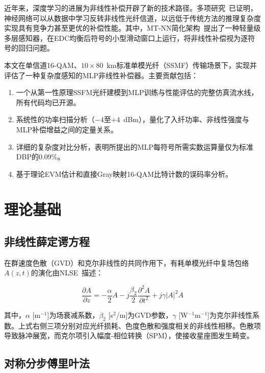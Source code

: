 \documentclass[conference]{IEEEtran}
\begin{document}
近年来，深度学习的进展为非线性补偿开辟了新的技术路径。多项研究~\cite{gdpkan2025,operator2025,mtnn2025}已证明，神经网络可以从数据中学习反转非线性光纤信道，以远低于传统方法的推理复杂度实现具有竞争力甚至更优的补偿性能。其中，MT-NN简化架构~\cite{mtnn2025}提出了一种轻量级多层感知器，在EDC均衡后符号的小型滑动窗口上运行，将非线性补偿视为逐符号的回归问题。

本文在单信道16-QAM、$10 \times 80$~km标准单模光纤（SSMF）传输场景下，实现并评估了一种复杂度感知的MLP非线性补偿器。主要贡献包括：

\begin{enumerate}
    \item 一个从第一性原理SSFM光纤建模到MLP训练与性能评估的完整仿真流水线，所有代码均已开源。
    \item 系统性的功率扫描分析（$-4$至$+4$~dBm），量化了入纤功率、非线性强度与MLP补偿增益之间的定量关系。
    \item 详细的复杂度对比分析，表明所提出的MLP每符号所需实数运算量仅为标准DBP的0.09\%。
    \item 基于理论EVM估计和直接Gray映射16-QAM比特计数的误码率分析。
\end{enumerate}

\section{理论基础}
\label{sec:theory}

\subsection{非线性薛定谔方程}

在群速度色散（GVD）和克尔非线性的共同作用下，有耗单模光纤中复场包络$A(z, t)$的演化由NLSE~\cite{agrawal2001}描述：

\begin{equation}
\frac{\partial A}{\partial z} = -\frac{\alpha}{2}A
- j\frac{\beta_2}{2}\frac{\partial^2 A}{\partial t^2}
+ j\gamma |A|^2 A
\label{eq:nlse}
\end{equation}

其中，$\alpha$ [m$^{-1}$]为场衰减系数，$\beta_2$ [s$^2$/m]为GVD参数，$\gamma$ [W$^{-1}$m$^{-1}$]为克尔非线性系数。上式右侧三项分别对应光纤损耗、色度色散和强度相关的非线性相移。色散项导致脉冲展宽，而克尔项引入幅度-相位转换（SPM），使接收星座图发生畸变。

\subsection{对称分步傅里叶法}
\end{document}
